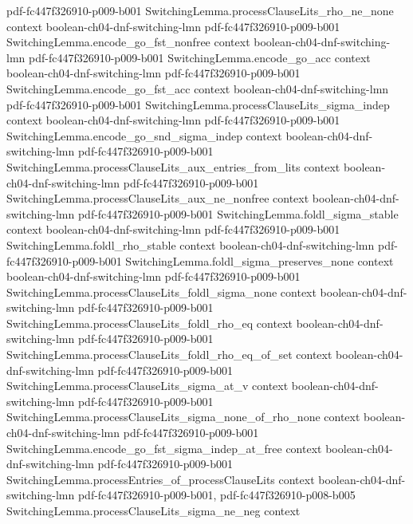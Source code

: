 \begin{theorem}
  {pdf-fc447f326910-p009-b001}
\proofstep
  {SwitchingLemma.processClauseLits_rho_ne_none}
  {context}
  {boolean-ch04-dnf-switching-lmn}
  {pdf-fc447f326910-p009-b001}
\proofstep
  {SwitchingLemma.encode_go_fst_nonfree}
  {context}
  {boolean-ch04-dnf-switching-lmn}
  {pdf-fc447f326910-p009-b001}
\proofstep
  {SwitchingLemma.encode_go_acc}
  {context}
  {boolean-ch04-dnf-switching-lmn}
  {pdf-fc447f326910-p009-b001}
\proofstep
  {SwitchingLemma.encode_go_fst_acc}
  {context}
  {boolean-ch04-dnf-switching-lmn}
  {pdf-fc447f326910-p009-b001}
\proofstep
  {SwitchingLemma.processClauseLits_sigma_indep}
  {context}
  {boolean-ch04-dnf-switching-lmn}
  {pdf-fc447f326910-p009-b001}
\proofstep
  {SwitchingLemma.encode_go_snd_sigma_indep}
  {context}
  {boolean-ch04-dnf-switching-lmn}
  {pdf-fc447f326910-p009-b001}
\proofstep
  {SwitchingLemma.processClauseLits_aux_entries_from_lits}
  {context}
  {boolean-ch04-dnf-switching-lmn}
  {pdf-fc447f326910-p009-b001}
\proofstep
  {SwitchingLemma.processClauseLits_aux_ne_nonfree}
  {context}
  {boolean-ch04-dnf-switching-lmn}
  {pdf-fc447f326910-p009-b001}
\proofstep
  {SwitchingLemma.foldl_sigma_stable}
  {context}
  {boolean-ch04-dnf-switching-lmn}
  {pdf-fc447f326910-p009-b001}
\proofstep
  {SwitchingLemma.foldl_rho_stable}
  {context}
  {boolean-ch04-dnf-switching-lmn}
  {pdf-fc447f326910-p009-b001}
\proofstep
  {SwitchingLemma.foldl_sigma_preserves_none}
  {context}
  {boolean-ch04-dnf-switching-lmn}
  {pdf-fc447f326910-p009-b001}
\proofstep
  {SwitchingLemma.processClauseLits_foldl_sigma_none}
  {context}
  {boolean-ch04-dnf-switching-lmn}
  {pdf-fc447f326910-p009-b001}
\proofstep
  {SwitchingLemma.processClauseLits_foldl_rho_eq}
  {context}
  {boolean-ch04-dnf-switching-lmn}
  {pdf-fc447f326910-p009-b001}
\proofstep
  {SwitchingLemma.processClauseLits_foldl_rho_eq_of_set}
  {context}
  {boolean-ch04-dnf-switching-lmn}
  {pdf-fc447f326910-p009-b001}
\proofstep
  {SwitchingLemma.processClauseLits_sigma_at_v}
  {context}
  {boolean-ch04-dnf-switching-lmn}
  {pdf-fc447f326910-p009-b001}
\proofstep
  {SwitchingLemma.processClauseLits_sigma_none_of_rho_none}
  {context}
  {boolean-ch04-dnf-switching-lmn}
  {pdf-fc447f326910-p009-b001}
\proofstep
  {SwitchingLemma.encode_go_fst_sigma_indep_at_free}
  {context}
  {boolean-ch04-dnf-switching-lmn}
  {pdf-fc447f326910-p009-b001}
\proofstep
  {SwitchingLemma.processEntries_of_processClauseLits}
  {context}
  {boolean-ch04-dnf-switching-lmn}
  {pdf-fc447f326910-p009-b001,
    pdf-fc447f326910-p008-b005}
\proofstep
  {SwitchingLemma.processClauseLits_sigma_ne_neg}
  {context}

\end{theorem}
